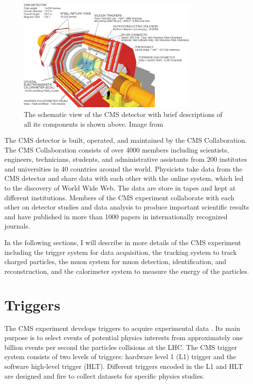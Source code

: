 \begin{figure}[hbtp]
\begin{center}
\includegraphics[width=0.80\textwidth]{Figures/Chapter3/CMSDecPic.jpg}
\caption{The schematic view of the CMS detector with brief descriptions of all its components is shown above. Image from \cite{HiggsCMS}}
\label{CMSDecPic}
\end{center}
\end{figure} 

The CMS detector is built, operated, and maintained by the CMS Collaboration. The CMS Collaboration consists of over 4000 members including scientists, engineers, technicians, students, and administrative assistants from 200 institutes and universities in 40 countries around the world. Physicists take data from the CMS detector and share data with each other with the online system, which led to the discovery of World Wide Web. The data are store in tapes and kept at different institutions. Members of the CMS experiment collaborate with each other on detector studies and data analysis to produce important scientific results and have published in more than 1000 papers in internationally recognized journals.

In the following sections, I will describe in more details of the CMS experiment including the trigger system for data acquisition, the tracking system to track charged particles, the muon system for muon detection, identification, and reconstruction, and the calorimeter system to measure the energy of the particles.

\section{Triggers}

The CMS experiment develops triggers to acquire experimental data \cite{CMSTrigger}. Its main purpose is to select events of potential physics interests from approximately one billion events per second the particles collisions at the LHC. The CMS trigger system consists of two levels of triggers: hardware level 1 (L1) trigger and the software high-level trigger (HLT). Different triggers encoded in the L1 and HLT are designed and fire to collect datasets for specific physics studies.

